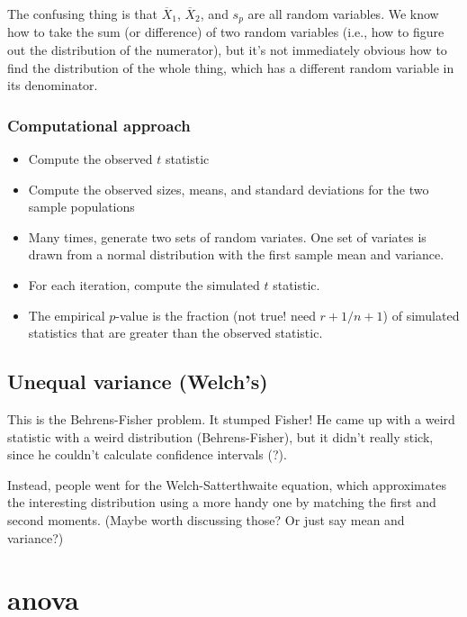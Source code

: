 The confusing thing is that \(\overline{X}_1\), \(\overline{X}_2\), and
\(s_p\) are all random variables. We know how to take the sum (or
difference) of two random variables (i.e., how to figure out the
distribution of the numerator), but it's not immediately obvious how to
find the distribution of the whole thing, which has a different random
variable in its denominator.

\subsubsection{Computational approach}\label{computational-approach}

\begin{itemize}
\tightlist
\item
  Compute the observed \(t\) statistic
\item
  Compute the observed sizes, means, and standard deviations for the two
  sample populations
\item
  Many times, generate two sets of random variates. One set of variates
  is drawn from a normal distribution with the first sample mean and
  variance.
\item
  For each iteration, compute the simulated \(t\) statistic.
\item
  The empirical \(p\)-value is the fraction (not true! need \(r+1/n+1\))
  of simulated statistics that are greater than the observed statistic.
\end{itemize}

\subsection{Unequal variance (Welch's)}\label{unequal-variance-welchs}

This is the Behrens-Fisher problem. It stumped Fisher! He came up with a
weird statistic with a weird distribution (Behrens-Fisher), but it
didn't really stick, since he couldn't calculate confidence intervals
(?).

Instead, people went for the Welch-Satterthwaite equation, which
approximates the interesting distribution using a more handy one by
matching the first and second moments. (Maybe worth discussing those? Or
just say mean and variance?)

\section{anova}\label{anova}

